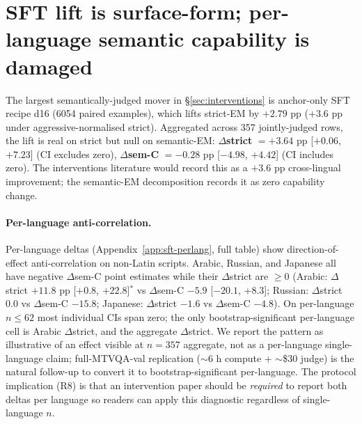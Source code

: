 \section{SFT lift is surface-form; per-language semantic capability is damaged}
\label{sec:sft}

The largest semantically-judged mover in \S\ref{sec:interventions} is anchor-only SFT recipe d16 (6054 paired examples), which lifts strict-EM by $+2.79$ pp ($+3.6$ pp under aggressive-normalised strict). Aggregated across 357 jointly-judged rows, the lift is real on strict but null on semantic-EM: \boldmath$\Delta$\textbf{strict} $\bm{= +3.64}$ pp [$+0.06$, $+7.23$]\unboldmath{} (CI excludes zero), \boldmath$\Delta$\textbf{sem-C} $\bm{= -0.28}$ pp [$-4.98$, $+4.42$]\unboldmath{} (CI includes zero). The interventions literature would record this as a $+3.6$ pp cross-lingual improvement; the semantic-EM decomposition records it as zero capability change.

\paragraph{Per-language anti-correlation.}
Per-language deltas (Appendix~\ref{app:sft-perlang}, full table) show direction-of-effect anti-correlation on non-Latin scripts. Arabic, Russian, and Japanese all have negative $\Delta$sem-C point estimates while their $\Delta$strict are $\geq 0$ (Arabic: $\Delta$strict $+11.8$ pp [$+0.8$, $+22.8$]$^*$ vs $\Delta$sem-C $-5.9$ [$-20.1$, $+8.3$]; Russian: $\Delta$strict $0.0$ vs $\Delta$sem-C $-15.8$; Japanese: $\Delta$strict $-1.6$ vs $\Delta$sem-C $-4.8$). On per-language $n \leq 62$ most individual CIs span zero; the only bootstrap-significant per-language cell is Arabic $\Delta$strict, and the aggregate $\Delta$strict. We report the pattern as illustrative of an effect visible at $n=357$ aggregate, not as a per-language single-language claim; full-MTVQA-val replication ($\sim$6 h compute + $\sim$\$30 judge) is the natural follow-up to convert it to bootstrap-significant per-language. The protocol implication (R8) is that an intervention paper should be \emph{required} to report both deltas per language so readers can apply this diagnostic regardless of single-language $n$.

